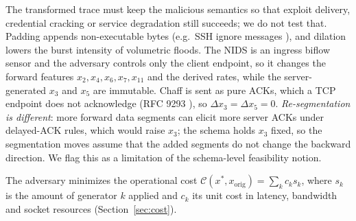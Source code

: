 The transformed trace must keep the malicious semantics so that exploit delivery, credential cracking or service degradation still succeeds; we do not test that. Padding appends non-executable bytes (e.g.\ SSH ignore messages \cite{rfc4253}), and dilation lowers the burst intensity of volumetric floods. The NIDS is an ingress biflow sensor and the adversary controls only the client endpoint, so it changes the forward features $x_2,x_4,x_6,x_7,x_{11}$ and the derived rates, while the server-generated $x_3$ and $x_5$ are immutable. Chaff is sent as pure ACKs, which a TCP endpoint does not acknowledge (RFC 9293 \cite{rfc9293}), so $\Delta x_3=\Delta x_5=0$. \emph{Re-segmentation is different}: more forward data segments can elicit more server ACKs under delayed-ACK rules, which would raise $x_3$; the schema holds $x_3$ fixed, so the segmentation moves assume that the added segments do not change the backward direction. We flag this as a limitation of the schema-level feasibility notion.

The adversary minimizes the operational cost $\mathcal{C}(x^*,x_{\text{orig}})=\sum_k c_ks_k$, where $s_k$ is the amount of generator $k$ applied and $c_k$ its unit cost in latency, bandwidth and socket resources (Section~\ref{sec:cost}).
